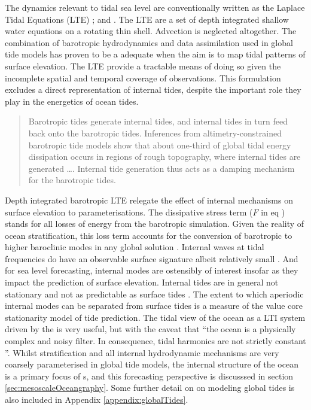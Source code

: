 The dynamics relevant to tidal sea level are conventionally written as the Laplace Tidal Equations (LTE) ; \cite[9.8]{gill1982atmosphere} and \cite{Hendershott:1981ub}.  The LTE are a set of depth integrated shallow water equations on a rotating thin shell.  Advection is neglected altogether.
The combination of barotropic hydrodynamics and data assimilation used in global tide models has proven to be a adequate when the aim is to map tidal patterns of surface elevation.  The LTE provide a tractable means of doing so given the incomplete spatial and temporal coverage of observations.
This formulation excludes a direct representation of internal tides, despite the important role they play in the energetics of ocean tides.
\begin{quote}
    Barotropic tides generate internal tides, and internal tides in turn feed back onto the barotropic tides. Inferences from altimetry-constrained barotropic tide models show that about one-third of global tidal energy dissipation occurs in regions of rough topography, where internal tides are generated \dots{}. Internal tide generation thus acts as a damping mechanism for the barotropic tides.\citep[pp22]{Arbic:hy}
\end{quote}
Depth integrated barotropic LTE relegate the effect of internal mechanisms on surface elevation to parameterisations.  The dissipative stress term ($F$ in eq \label{E:LTE_momtm}) stands for all losses of energy from the barotropic simulation.  Given the reality of ocean stratification, this loss term accounts for the conversion of barotropic to higher baroclinic modes in any global solution \cite[pp121] {gill1982atmosphere}.
Internal waves at tidal frequencies do have an observable surface signature albeit relatively small \cite{Ray:2011tj}.   
And for sea level forecasting, internal modes are ostensibly of interest insofar as they impact the prediction of surface elevation.  
Internal tides are in general not stationary and not as predictable as surface tides \cite{Nash:2012}.  The extent to which aperiodic internal modes can be separated from surface tides is a measure of the value core stationarity model of  tide prediction.
The tidal view of the ocean as a LTI system driven by the \ATGP{} is very useful, but with the caveat that ``the ocean is a physically complex and noisy filter.  In consequence, tidal harmonics are not strictly constant \citep[197]{Ray:2010jm}''.  
Whilst stratification and all internal hydrodynamic mechanisms are very coarsely parameterised in global tide models, the internal structure of the ocean is a primary focus of \OGCM{}s, and this forecasting perspective is discusssed in section \ref{sec:mesoscaleOceangraphy}.  Some further detail on on modeling global tides is also included in Appendix \ref{appendix:globalTides}.

